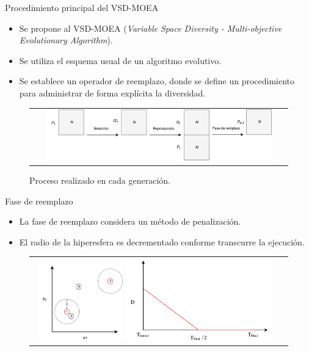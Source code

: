 \documentclass{beamer}
\begin{document}
\begin{frame}{Procedimiento principal del VSD-MOEA}
\begin{itemize}
\justifying
\item Se propone al VSD-MOEA (\textit{Variable Space Diversity - Multi-objective Evolutionary Algorithm}).
\justifying
\item Se utiliza el esquema usual de un algoritmo evolutivo.
\justifying
\item Se establece un operador de reemplazo, donde se define un procedimiento para administrar de forma explícita la diversidad.
\end{itemize}
\begin{figure}
\centering
\begin{tabular}{c}
\includegraphics[width=0.9\textwidth]{Images/Evolution_Process.pdf}
\end{tabular}
\caption{Proceso realizado en cada generación.}
\label{fig:DiversityProposal}
\end{figure}
\end{frame}


\begin{frame}{Fase de reemplazo}
\begin{itemize}
\justifying
\item La fase de reemplazo considera un método de penalización.
\justifying
\item El radio de la hiperesfera es decrementado conforme transcurre la ejecución.
\end{itemize}
\begin{figure}
\centering
\begin{tabular}{cc}
\includegraphics[width=0.35\textwidth]{Images/Metodo_Penalizacion.pdf} \quad \quad \quad
\includegraphics[width=0.6\textwidth]{Images/Modelo.pdf}
\end{tabular}
\label{fig:DiversityProposal}
\end{figure}
\end{frame}
\end{document}

